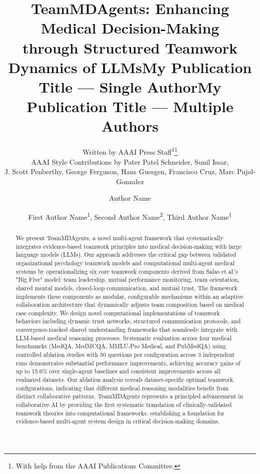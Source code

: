 \documentclass[letterpaper]{article} %
\title{TeamMDAgents: Enhancing Medical
Decision-Making \\through Structured Teamwork
Dynamics of LLMs}
\author{
    Written by AAAI Press Staff\textsuperscript{\rm 1}\thanks{With help from the AAAI Publications Committee.}\\
    AAAI Style Contributions by Pater Patel Schneider,
    Sunil Issar,\\
    J. Scott Penberthy,
    George Ferguson,
    Hans Guesgen,
    Francisco Cruz\equalcontrib,
    Marc Pujol-Gonzalez\equalcontrib
}
\title{My Publication Title --- Single Author}
\author {
    Author Name
}
\title{My Publication Title --- Multiple Authors}
\author {
    First Author Name\textsuperscript{\rm 1},
    Second Author Name\textsuperscript{\rm 2},
    Third Author Name\textsuperscript{\rm 1}
}
\begin{document}
\maketitle

\begin{abstract}
We present TeamMDAgents, a novel multi-agent framework that systematically integrates evidence-based teamwork principles into medical decision-making with large language models (LLMs). Our approach addresses the critical gap between validated organizational psychology teamwork models and computational multi-agent medical systems by operationalizing six core teamwork components derived from Salas et al.'s "Big Five" model: team leadership, mutual performance monitoring, team orientation, shared mental models, closed-loop communication, and mutual trust. The framework implements these components as modular, configurable mechanisms within an adaptive collaboration architecture that dynamically adjusts team composition based on medical case complexity. We design novel computational implementations of teamwork behaviors including dynamic trust networks, structured communication protocols, and convergence-tracked shared understanding frameworks that seamlessly integrate with LLM-based medical reasoning processes. Systematic evaluation across four medical benchmarks (MedQA, MedMCQA, MMLU-Pro Medical, and PubMedQA) using controlled ablation studies with 50 questions per configuration across 3 independent runs demonstrates substantial performance improvements, achieving accuracy gains of up to 15.6\% over single-agent baselines and consistent improvements across all evaluated datasets. Our ablation analysis reveals dataset-specific optimal teamwork configurations, indicating that different medical reasoning modalities benefit from distinct collaborative patterns. TeamMDAgents represents a principled advancement in collaborative AI by providing the first systematic translation of clinically-validated teamwork theories into computational frameworks, establishing a foundation for evidence-based multi-agent system design in critical decision-making domains.
\end{abstract}

\begin{links}
\end{links}
\end{document}
